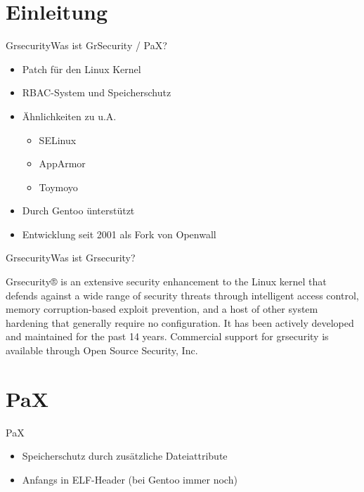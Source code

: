 

\mode*
\begin{frame}
    \titlepage
\end{frame}

\begin{frame}
    \tableofcontents
\end{frame}

\section{Einleitung}
\begin{frame}{Grsecurity}{Was ist GrSecurity / PaX?}
    \begin{itemize}
        \item Patch für den Linux Kernel
        \item RBAC-System und Speicherschutz
        \item Ähnlichkeiten zu u.A.
            \begin{itemize}
                \item SELinux
                \item AppArmor
                \item Toymoyo
            \end{itemize}
        \item Durch Gentoo ünterstützt
        \item Entwicklung seit 2001 als Fork von Openwall
    \end{itemize}
\end{frame}

\begin{frame}{Grsecurity}{Was ist Grsecurity?}
    \begin{Definition} %
        Grsecurity® is an extensive security enhancement to the Linux kernel that defends against a wide range of security threats through intelligent access control, memory corruption-based exploit prevention, and a host of other system hardening that generally require no configuration. It has been actively developed and maintained for the past 14 years. Commercial support for grsecurity is available through Open Source Security, Inc. \cite{grsechp}
    \end{Definition}
\end{frame}

\section{PaX}
\begin{frame}{PaX}
    \begin{itemize}
        \item Speicherschutz durch zusätzliche Dateiattribute
        \item Anfangs in ELF-Header (bei Gentoo immer noch)
    \end{itemize}
\end{frame}


